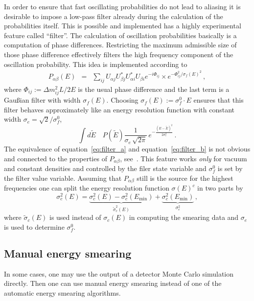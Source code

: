 In order to ensure that fast oscillating probabilities do not lead to aliasing
it is desirable to impose a low-pass filter already during the calculation
of the probabilities itself. This is possible and implemented has a highly
experimental feature called ``filter''. 
The calculation of oscillation
probabilities basically is a computation of phase differences. Restricting
the maximum admissible size of those phase difference effectively filters
the high frequency component of the oscillation probability. This idea is
implemented according to
\begin{eqnarray}
\label{eq:filter_a}
P_{\alpha\beta}(E)&=&\sum_{ij}
U_{\alpha j} U^*_{\beta j} U^*_{\alpha i} U_{\beta i} 
e^{-i\Phi_{ij}}\times 
e^{ -\Phi_{ij}^2/\sigma_f(E)^2 }\,,
\end{eqnarray}
where $\Phi_{ij}:=\Delta m_{ij}^2 L/2E$ is the usual phase difference and
the last term is a Gau\ss ian filter with width $\sigma_f(E)$. Choosing
$\sigma_f(E):=\sigma_f^0 \cdot E$ ensures that this filter behaves 
approximately like an energy resolution function with constant width 
$\sigma_e=\sqrt{2}/\sigma_f^0$, \ie\
\begin{equation}
\label{eq:filter_b}
\int d\tilde E\quad P(\tilde E) \frac{1}{\sigma_e\,\sqrt{2\pi}}\,
e^{-\frac{(E-\tilde E)^2}{2\sigma^2_e}}\,.
\end{equation}
The equivalence of equation~\ref{eq:filter_a} and equation~\ref{eq:filter_b}
is not obvious and connected to the properties of $P_{\alpha\beta}$, 
see~\cite{Kiers:1996zj,Giunti:2003ax}. This feature works \emph{only} 
for vacuum and constant densities and controlled
by the filer state variable and $\sigma_f^0$ is set by the filter value 
variable. Assuming that $P_{\alpha\beta}$ still is the source for the highest
frequencies one can split the energy resolution function $\sigma(E)^c$ in
two parts by
\begin{equation}
\sigma_c^2(E)=\underbrace{\sigma_c^2(E)-\sigma_c^2(E_\mathrm{min})}_
{\tilde\sigma^2_c(E)}+\underbrace{\sigma_c^2(E_\mathrm{min})}_{\sigma_e^2}\,,
\end{equation}
where $\tilde\sigma_c(E)$ is used instead of $\sigma_c(E)$ in computing the
smearing data and $\sigma_e$ is used to determine $\sigma_f^0$.

\subsection{Manual energy smearing}

In some cases, one may use the output of a detector Monte Carlo simulation
directly. Then one can use manual energy smearing instead of one of the
automatic energy smearing algorithms. 

